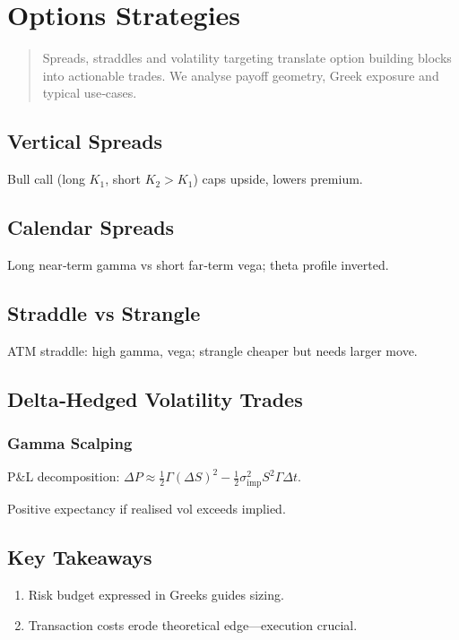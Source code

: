 \chapter{Options Strategies}\label{ch:optstrategies}

\begin{abstract}
Spreads, straddles and volatility targeting translate option building
blocks into actionable trades.  We analyse payoff geometry, Greek
exposure and typical use‑cases.
\end{abstract}

\section{Vertical Spreads}

Bull call (long \(K_1\), short \(K_2>K_1\)) caps upside, lowers premium.

\section{Calendar Spreads}

Long near‑term gamma vs short far‑term vega; theta profile inverted.

\section{Straddle vs Strangle}

ATM straddle: high gamma, vega; strangle cheaper but needs larger move.

\section{Delta‑Hedged Volatility Trades}

\subsection{Gamma Scalping}

P\&L decomposition:
\(\Delta P \approx \tfrac12\Gamma (\Delta S)^2 - \tfrac12 \sigma_\text{imp}^2 S^2 \Gamma \Delta t\).

Positive expectancy if realised vol exceeds implied.

\section*{Key Takeaways}

\begin{enumerate}
  \item Risk budget expressed in Greeks guides sizing.
  \item Transaction costs erode theoretical edge—execution crucial.
\end{enumerate}
